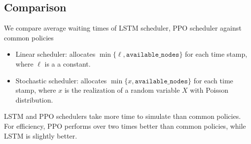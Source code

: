 \subsection{Comparison}
\begin{frame}
    We compare average waiting times of LSTM scheduler, PPO scheduler against common policies
    \begin{itemize}
        \item Linear scheduler: allocates $\min\{\ell, \texttt{available\_nodes}\}$ for each time stamp, where $\ell$ is a a constant.
        \item Stochastic scheduler: allocates $\min\{x, \texttt{available\_nodes}\}$ for each time stamp, where $x$ is the realization of a random variable $X$ with Poisson distribution.
    \end{itemize}

    LSTM and PPO schedulers take more time to simulate than common policies. For efficiency, PPO performs over two times better than common policies, while LSTM is slightly better.
\end{frame}